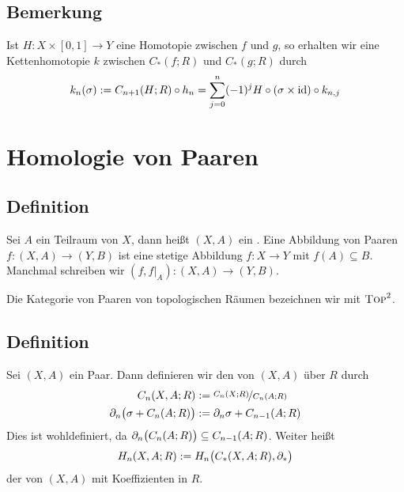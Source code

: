 
\subsection[Bemerkung: Konstruktion einer Kettenhomotopie aus einer Homotopie]{Bemerkung} %
\label{sub:713}
Ist $H \colon X \times [0,1] \to Y$ eine Homotopie zwischen $f$ und $g$, so erhalten wir eine Kettenhomotopie $k$ zwischen $C_*(f;R)$ und $C_*(g;R)$ durch
\[
	k_n(\sigma) := C_{n+1}(H;R) \circ h_n = \sum_{j=0}^{n} (-1)^j H \circ (\sigma \times \id) \circ k_{n,j}
\]
\newpage

\section{Homologie von Paaren} %
\label{sec:8}

\subsection[Definition: Paar von topologischen Räumen]{Definition} %
\label{sub:81}
Sei $A$ ein Teilraum von $X$, dann heißt $(X,A)$ ein . Eine Abbildung von Paaren $f \colon (X,A) \to (Y,B)$ ist eine stetige Abbildung
$f \colon X \to Y$ mit $f(A) \subseteq B$. Manchmal schreiben wir $(f,f|_{A}) : (X,A) \to (Y,B)$. 

\noindent Die Kategorie von Paaren von topologischen Räumen bezeichnen wir mit $\TOP^2$.

\subsection[Definition: Singulärer Kettenkomplex und Homologiemodul von Paaren]{Definition} %
\label{sub:82}
Sei $(X,A)$ ein Paar. Dann definieren wir den  von $(X,A)$ über $R$ durch
\begin{align*}
	C_n(X,A;R) &:= \nicefrac{C_n(X;R)}{C_n(A;R)} \\
	\partial_n \enbrace[\big]{\sigma+ C_n(A;R)} &:= \partial_n \sigma + C_{n-1}(A;R)
\end{align*}
Dies ist wohldefiniert, da $\partial_n \enbrace[\big]{C_n(A;R)} \subseteq C_{n-1}(A;R)$. Weiter heißt
\[
	H_n(X,A;R) := H_n \enbrace[\big]{C_*(X,A;R),\partial_*} 
\]
der  von $(X,A)$ mit Koeffizienten in $R$.

